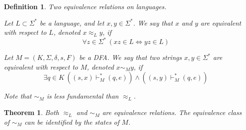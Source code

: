 \documentclass[aps,pra,onecolumn,notitlepage,superscriptaddress]{revtex4-1}
\def\ys{\vdash^*}
\newtheorem{theo}{Theorem}
\newtheorem{defi}{Definition}
\begin{document}
    \begin{defi}
        Two equivalence relations on languages.

        Let $L \subset \Sigma^*$ be a language, and let $x, y \in \Sigma^*$. We say that $x$ and $y$ are equivalent with respect to $L$, denoted $x \approx_L y$, if 
        \begin{equation*}
            \forall z \in \Sigma^* \ (xz \in L \Leftrightarrow yz \in L)
        \end{equation*}

        Let $M = (K, \Sigma, \delta, s, F)$ be a DFA. We say that two strings $x, y \in \Sigma^*$ are equivalent with respect to $M$, denoted $x \sim_M y$, if
        \begin{equation*}
            \exists q \in K \ ((s, x) \ys_M (q, e)) \land ((s, y) \ys_M (q, e))
        \end{equation*}

        Note that $\sim_M$ is less fundamental than $\approx_L$.
    \end{defi}

    \begin{theo}
        Both $\approx_L$ and $\sim_M$ are equivalence relations. The equivalence class of $\sim_M$ can be identified by the states of $M$.
    \end{theo}
\end{document}
